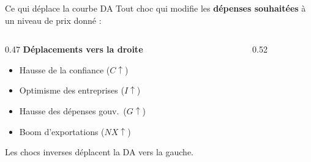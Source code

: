 \documentclass[aspectratio=169]{beamer}
\begin{document}
\begin{frame}[t]{Ce qui déplace la courbe DA}\examtag
   \small
   Tout choc qui modifie les \textbf{dépenses souhaitées} à un niveau de prix donné :
   \vspace{0.5cm}
   \begin{columns}[T]
      \begin{column}{0.47\textwidth}
         \textbf{\textcolor{HECgreen}{Déplacements vers la droite}}
         \vspace{0.15cm}
         \begin{itemize}
            \setlength\itemsep{0.2cm}
            \item Hausse de la confiance ($C \uparrow$)
            \item Optimisme des entreprises ($I \uparrow$)
            \item Hausse des dépenses gouv.\ ($G \uparrow$)
            \item Boom d'exportations ($NX \uparrow$)
         \end{itemize}
         \vspace{0.2cm}
         {\footnotesize\textcolor{HECgray}{Les chocs inverses déplacent la DA vers la gauche.}}
      \end{column}
      \begin{column}{0.52\textwidth}
         \centering
         \vspace{0.2cm}
      \end{column}
   \end{columns}
\end{frame}
\end{document}
